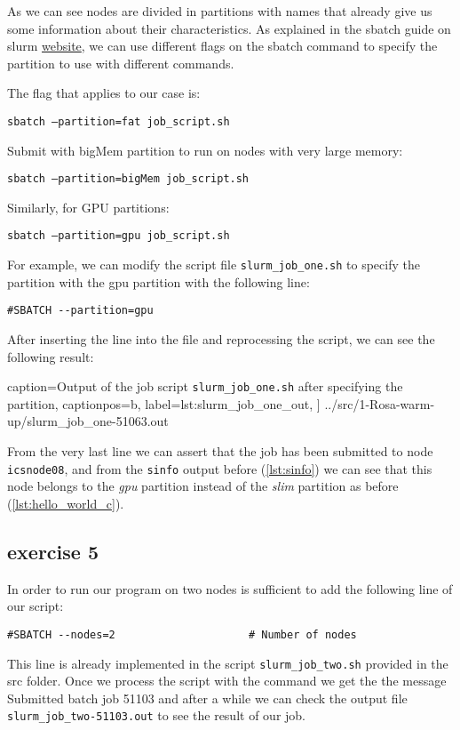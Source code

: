 \documentclass[unicode,11pt,a4paper,oneside,numbers=endperiod,openany]{scrartcl}
\begin{document}
As we can see nodes are divided in partitions with names that already give us some information about their characteristics.
As explained in the sbatch guide on slurm \href{https://slurm.schedmd.com/sbatch.html}{website}, we can use different flags on the sbatch command to specify the partition to use with different commands.


The flag that applies to our case is:

\quad\quad\texttt{sbatch --partition=fat job\_script.sh}

Submit with bigMem partition to run on nodes with very large memory:

\quad\quad\texttt{sbatch --partition=bigMem job\_script.sh}

Similarly, for GPU partitions:

\quad\quad\texttt{sbatch --partition=gpu job\_script.sh}

For example, we can modify the script file \texttt{slurm\_job\_one.sh} to specify the partition with the gpu partition with the following line:
\begin{verbatim}
#SBATCH --partition=gpu
\end{verbatim}

After inserting the line into the file and reprocessing the script, we can see the following result:


    caption={Output of the job script \texttt{slurm\_job\_one.sh} after specifying the partition},
    captionpos=b,
    label={lst:slurm_job_one_out},
]
{../src/1-Rosa-warm-up/slurm_job_one-51063.out}

From the very last line we can assert that the job has been submitted to node \texttt{icsnode08}, and from the \texttt{sinfo} output before (\ref{lst:sinfo}) we can see that this node belongs to the \textit{gpu} partition instead of the \textit{slim} partition as before (\ref{lst:hello_world_c}).

\subsection{exercise 5}

In order to run our program on two nodes is sufficient to add the following line of our script:
\begin{verbatim}
#SBATCH --nodes=2                     # Number of nodes
\end{verbatim}
This line is already implemented in the script \texttt{slurm\_job\_two.sh} provided in the src folder. Once we process the script with the command we get the the message Submitted batch job 51103 and after a while we can check the output file \texttt{slurm\_job\_two-51103.out} to see the result of our job.
\end{document}
